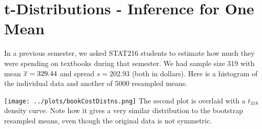 \def\theTopic{t Procedures for a Single Mean }
\def\dayNum{24 }


\section{t-Distributions - Inference for One Mean}



In a previous semester, we asked STAT216 students to estimate how much they were
spending on textbooks during that semester.  We had sample size 319
with mean $\overline{x} = 329.44$ and spread $s = 202.93$ (both in
dollars). Here is a histogram of 
the individual data and another of 5000 resampled means.


\texttt{[image: ../plots/bookCostDistns.png]}
The second plot is overlaid with a $t_{318}$ density curve.  Note how
it gives a very similar distribution to the bootstrap resampled means,
even though the original data is not symmetric.

